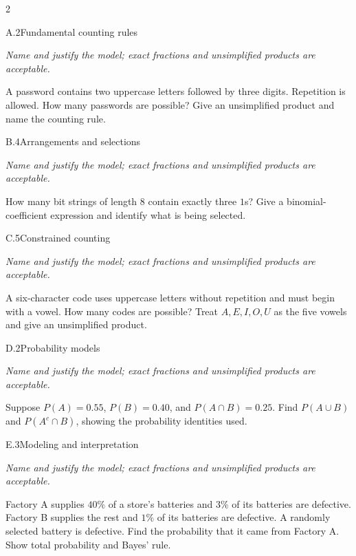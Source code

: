\documentclass[9pt]{extarticle}
\begin{document}
\CoreWorkArea
\FormBreak
{}
\begin{multicols}{2}
\begin{CoreProblem}{A.2}{Fundamental counting rules}
{\scriptsize\textit{Name and justify the model; exact fractions and unsimplified products are acceptable.}\par}
A password contains two uppercase letters followed by three digits.
    Repetition is allowed. How many passwords are possible? Give an unsimplified
    product and name the counting rule.
\end{CoreProblem}
\begin{CoreProblem}{B.4}{Arrangements and selections}
{\scriptsize\textit{Name and justify the model; exact fractions and unsimplified products are acceptable.}\par}
How many bit strings of length 8 contain exactly three $1$s? Give a
    binomial-coefficient expression and identify what is being selected.
\end{CoreProblem}
\begin{CoreProblem}{C.5}{Constrained counting}
{\scriptsize\textit{Name and justify the model; exact fractions and unsimplified products are acceptable.}\par}
A six-character code uses uppercase letters without repetition and
    must begin with a vowel. How many codes are possible? Treat
    $A,E,I,O,U$ as the five vowels and give an unsimplified product.
\end{CoreProblem}
\columnbreak
\begin{CoreProblem}{D.2}{Probability models}
{\scriptsize\textit{Name and justify the model; exact fractions and unsimplified products are acceptable.}\par}
Suppose $P(A)=0.55$, $P(B)=0.40$, and $P(A\cap B)=0.25$. Find
    $P(A\cup B)$ and $P(A^c\cap B)$, showing the probability identities used.
\end{CoreProblem}
\begin{CoreProblem}{E.3}{Modeling and interpretation}
{\scriptsize\textit{Name and justify the model; exact fractions and unsimplified products are acceptable.}\par}
Factory A supplies $40\%$ of a store's batteries and $3\%$ of its
    batteries are defective. Factory B supplies the rest and $1\%$ of its
    batteries are defective. A randomly selected battery is defective. Find the
    probability that it came from Factory A. Show total probability and Bayes'
    rule.
\end{CoreProblem}
\end{multicols}
\end{document}
